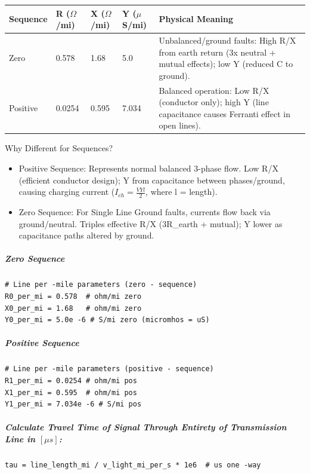 \bigskip\noindent
\begin{tabular}{p{}p{}p{}p{}p{}}
\toprule
Sequence & R ($\Omega$/mi) & X ($\Omega$/mi) & Y ($\mu$S/mi) & Physical Meaning \\
\hline
Zero & 0.578 & 1.68 & 5.0 & Unbalanced/ground faults: High R/X from earth return (3x neutral + mutual effects); low Y (reduced C to ground). \\
Positive & 0.0254 & 0.595 & 7.034 & Balanced operation: Low R/X (conductor only); high Y (line capacitance causes Ferranti effect in open lines). \\
\bottomrule
\end{tabular}

\bigskip

Why Different for Sequences?

\begin{itemize}
\item Positive Sequence: Represents normal balanced 3-phase flow. Low R/X (efficient conductor design); Y from capacitance between phases/ground, causing charging current ($I_{ch} = \frac{V Y l }{2}$, where l = length).
\item Zero Sequence: For Single Line Ground faults, currents flow back via ground/neutral. Triples effective R/X (3R\_earth + mutual); Y lower as capacitance paths altered by ground.
\end{itemize}

\subparagraph{Zero Sequence}

\begin{verbatim}
# Line per -mile parameters (zero - sequence)
R0_per_mi = 0.578  # ohm/mi zero
X0_per_mi = 1.68   # ohm/mi zero
Y0_per_mi = 5.0e -6 # S/mi zero (micromhos = uS)
\end{verbatim}

\subparagraph{Positive Sequence}

\begin{verbatim}
# Line per -mile parameters (positive - sequence)
R1_per_mi = 0.0254 # ohm/mi pos
X1_per_mi = 0.595  # ohm/mi pos
Y1_per_mi = 7.034e -6 # S/mi pos
\end{verbatim}

\subparagraph{Calculate Travel Time of Signal Through Entirety of Transmission Line in $\left[\mu s\right]$:}

\begin{verbatim}
tau = line_length_mi / v_light_mi_per_s * 1e6  # us one -way
\end{verbatim}

